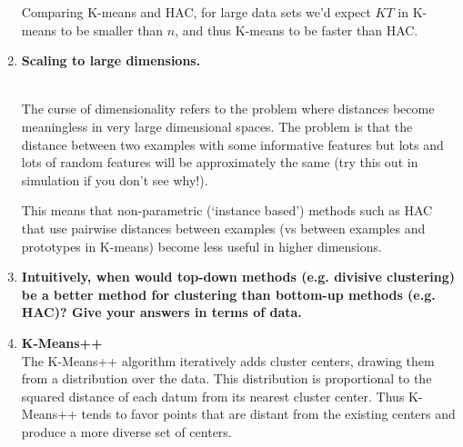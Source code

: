 \documentclass[12pt,letterpaper]{article}
\begin{document}
\begin{enumerate}
\begin{solution}
Comparing K-means and HAC, for large data sets we'd expect $KT$ in
K-means to be smaller than $n$, and thus K-means to be faster than
HAC.
\end{solution}

\vspace{3 in}

\item {\bf Scaling to large dimensions.}\\
\\

\begin{solution}
The curse of dimensionality refers to the problem
%
%
where distances become meaningless in very large dimensional spaces.
The problem is that the distance
between two examples with
some informative features but lots
and lots of random features 
will be approximately the same (try this out in simulation
if you don't see why!). 

This means that non-parametric (`instance based') 
methods such as HAC that use pairwise distances between
examples (vs between examples and prototypes in K-means) 
become less useful in higher dimensions.

\end{solution}

\item {\bf Intuitively, when would top-down methods (e.g. divisive clustering) be a better method for clustering than bottom-up methods (e.g. HAC)? Give your answers in terms of data.}\\

\item {\bf K-Means++ }\\
The K-Means++ algorithm iteratively adds cluster centers, drawing them from a distribution over the data.  This distribution is proportional to the squared distance of each datum from its nearest cluster center.  Thus K-Means++ tends to favor points that are distant from the existing centers and produce a more diverse set of centers.

\fi


\end{enumerate}
\end{document}
